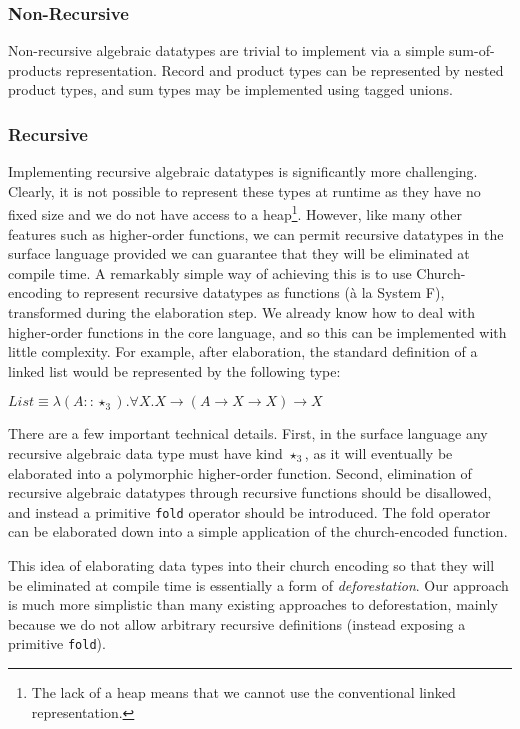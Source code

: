 \documentclass[runningheads]{llncs}
\begin{document}
\subsubsection{Non-Recursive}

Non-recursive algebraic datatypes are trivial to implement via a simple sum-of-products representation. Record and product types can be represented by nested product types, and sum types may be implemented using tagged unions.

\subsubsection{Recursive}

Implementing recursive algebraic datatypes is significantly more challenging. Clearly, it is not possible to represent these types at runtime as they have no fixed size and we do not have access to a heap\footnote{The lack of a heap means that we cannot use the conventional linked representation.}. However, like many other features such as higher-order functions, we can permit recursive datatypes in the surface language provided we can guarantee that they will be eliminated at compile time. A remarkably simple way of achieving this is to use Church-encoding to represent recursive datatypes as functions (à la System F), transformed during the elaboration step. We already know how to deal with higher-order functions in the core language, and so this can be implemented with little complexity. For example, after elaboration, the standard definition of a linked list would be represented by the following type:

$List \equiv \lambda (A :: \star_3). \forall X. X \rightarrow (A \rightarrow X \rightarrow X) \rightarrow X$

There are a few important technical details. First, in the surface language any recursive algebraic data type must have kind $\star_3$, as it will eventually be elaborated into a polymorphic higher-order function. Second, elimination of recursive algebraic datatypes through recursive functions should be disallowed, and instead a primitive \texttt{fold} operator should be introduced. The fold operator can be elaborated down into a simple application of the church-encoded function.

This idea of elaborating data types into their church encoding so that they will be eliminated at compile time is essentially a form of \emph{deforestation}\cite{wadler1988deforestation}. Our approach is much more simplistic than many existing approaches to deforestation, mainly because we do not allow arbitrary recursive definitions (instead exposing a primitive \texttt{fold}).
\end{document}
